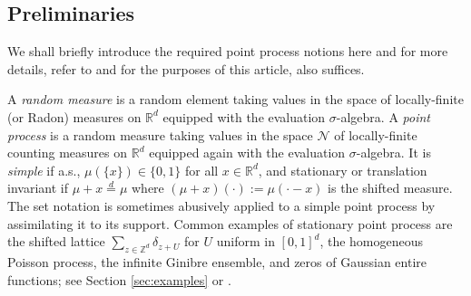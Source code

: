 \documentclass[12pt]{article}
\newtheorem{definition}{Definition}
\newcommand{\R}{\mathbb{R}}
\newcommand{\Z}{\mathbb{Z}}
\newcommand{\1}{\mathbf{1}}
\begin{document}
%

\subsection{Preliminaries}
We shall briefly introduce the required point process notions here and for more details, refer to \cite{hough2009zeros,kallenberg2017random,last2017lectures,
baccelli2020random} {and for the purposes of this article, \cite{coste2021order} also suffices.}

 {A {\it random measure} is a random element taking values in the space of locally-finite (or Radon) measures on $\R^d$ equipped with the evaluation $\sigma$-algebra.} A {\it point process} is a random measure  taking values in the space  {$  \mathscr   N$} of locally-finite counting measures on $\R^d$ equipped again with the evaluation $\sigma$-algebra. It is {\it simple} if a.s., $\mu(\{x\}) \in \{0, 1\}$ for all $x \in \R^d$, and   stationary or translation invariant if $\mu + x \overset{d}{=} \mu$ where $(\mu + x)(\cdot) := \mu(\cdot - x)$ is the shifted measure. {The set notation} is sometimes abusively applied to a simple point process by assimilating it to its support. Common examples of stationary point process are the shifted lattice $\sum_{z \in \Z^d}\delta_{z+U}$ for $U$ uniform in $[0,1]^d$, the homogeneous Poisson process, the infinite Ginibre ensemble, and zeros of Gaussian entire functions; see Section \ref{sec:examples} or \cite[Section 3]{coste2021order}.
\end{document}
